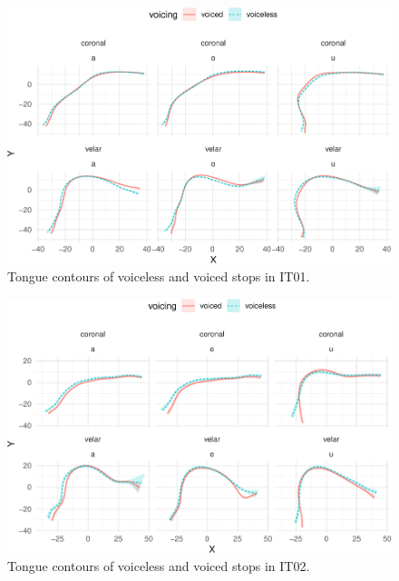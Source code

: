 \documentclass[12pt,]{article}
\begin{document}
\begin{figure}

{\centering \includegraphics[width=.8\textwidth]{2018-polar-gam_files/figure-latex/tongues-it01-1} 

}

\caption{Tongue contours of voiceless and voiced stops in IT01.}\label{f:tongues-it01}
\end{figure}

\begin{figure}

{\centering \includegraphics[width=.8\textwidth]{2018-polar-gam_files/figure-latex/tongues-it02-1} 

}

\caption{Tongue contours of voiceless and voiced stops in IT02.}\label{f:tongues-it02}
\end{figure}
\end{document}
